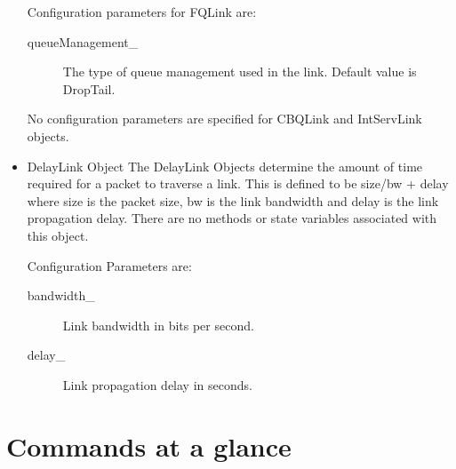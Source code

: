\begin{itemize}
Configuration parameters for FQLink are:
\begin{description}
\item[queueManagement\_] The type of queue management used in the link.
                        Default value is DropTail.
\end{description}

No configuration parameters are specified for CBQLink and IntServLink
objects.


\item DelayLink Object
The DelayLink Objects determine the amount of time required for a packet
to traverse a link. This is defined to be size/bw + delay where size is
the packet size, bw is the link bandwidth and delay is the link
propagation delay. There are no methods or state variables associated with
this object. 

Configuration Parameters are:
\begin{description}

\item[bandwidth\_] Link bandwidth in bits per second. 

\item[delay\_] Link propagation delay in seconds. 
\end{description}
\end{itemize}

\section{Commands at a glance}
\label{sec:linkscommand}

